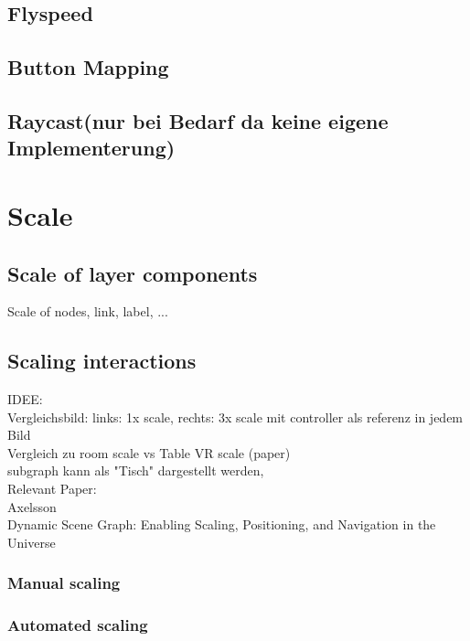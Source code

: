 \subsection{Flyspeed}
\subsection{Button Mapping}
\subsection{Raycast(nur bei Bedarf da keine eigene Implementerung)}

\section{Scale}
\subsection{Scale of layer components}
Scale of nodes, link, label, ...
\subsection{Scaling interactions}

IDEE:\\
Vergleichsbild: links: 1x scale, rechts: 3x scale mit controller als referenz in jedem Bild\\
Vergleich zu room scale vs Table VR scale (paper)\\
subgraph kann als "Tisch" dargestellt werden, 
\\
Relevant Paper: \\
Axelsson\\
Dynamic Scene Graph: Enabling Scaling, Positioning, and Navigation in the Universe


\subsubsection{Manual scaling}
\subsubsection{Automated scaling}
